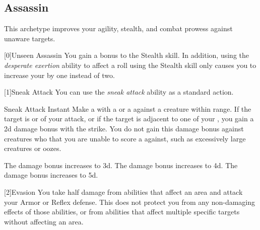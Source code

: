     \newpage
    \subsection{Assassin}
        This archetype improves your agility, stealth, and combat prowess against unaware targets.

        [0]{Unseen Assassin} You gain a  bonus to the Stealth skill.
        In addition, using the \textit{desperate exertion} ability to affect a roll using the Stealth skill only causes you to increase your  by one instead of two.

        [1]{Sneak Attack}
        You can use the \textit{sneak attack} ability as a standard action.
        \begin{instantability}{Sneak Attack}
            Instant
            \rankline
            Make a  with a  or a  against a creature within \rngshort range.
            If the target is \unaware or \partiallyunaware of your attack, or if the target is adjacent to one of your , you gain a \plus2d damage bonus with the strike.
            You do not gain this damage bonus against creatures who that you are unable to score a  against, such as excessively large creatures or oozes.

            \rankline
             The damage bonus increases to \plus3d.
             The damage bonus increases to \plus4d.
             The damage bonus increases to \plus5d.
        \end{instantability}

        [2]{Evasion} You take half damage from abilities that affect an area and attack your Armor or Reflex defense.
        This does not protect you from any non-damaging effects of those abilities, or from abilities that affect multiple specific targets without affecting an area.

